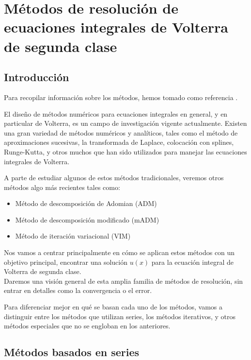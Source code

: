\chapter{Métodos de resolución de ecuaciones integrales de Volterra de segunda clase}

\section{Introducción}
Para recopilar información sobre los métodos, hemos tomado como referencia \cite{WazWaz}.

El diseño de métodos numéricos para ecuaciones integrales en general, y en particular de Volterra, es un campo de investigación vigente actualmente.
Existen una gran variedad de métodos numéricos y analíticos, tales como el método de aproximaciones sucesivas, la transformada de Laplace, colocación con splines, Runge-Kutta, y otros muchos que han sido utilizados para manejar las ecuaciones integrales de Volterra.

A parte de estudiar algunos de estos métodos tradicionales, veremos otros métodos algo más recientes tales como:
\begin{itemize}
	\item Método de descomposición de Adomian (ADM)
	\item Método de descomposición modificado (mADM)
	\item Método de iteración variacional (VIM)
\end{itemize}
Nos vamos a centrar principalmente en cómo se aplican estos métodos con un objetivo principal, encontrar una solución $u(x)$ para la ecuación integral de Volterra de segunda clase.\\Daremos una visión general de esta amplia familia de métodos de resolución, sin entrar en detalles como la convergencia o el error.

Para diferenciar mejor en qué se basan cada uno de los métodos, vamos a distinguir entre los métodos que utilizan series, los métodos iterativos, y otros métodos especiales que no se engloban en los anteriores.
\section{Métodos basados en series}
